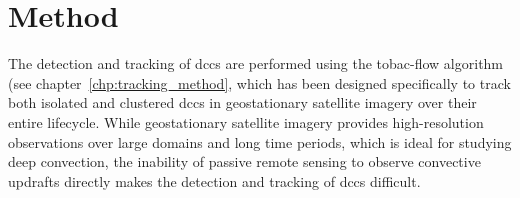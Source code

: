 \section{Method}

The detection and tracking of \acrshort{dcc}s are performed using the tobac-flow algorithm (see chapter~\ref{chp:tracking_method}, which has been designed specifically to track both isolated and clustered \acrshort{dcc}s in geostationary satellite imagery over their entire lifecycle. 
While geostationary satellite imagery provides high-resolution observations over large domains and long time periods, which is ideal for studying deep convection, the inability of passive remote sensing to observe convective updrafts directly makes the detection and tracking of \acrshort{dcc}s difficult.


